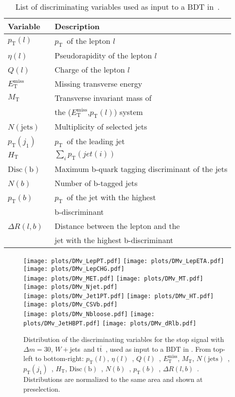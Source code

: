 \documentclass{article}
\newcommand{\pt}{\ensuremath{p_{\mathrm{T}}}~}
\newcommand{\ptl}{\ensuremath{p_{\mathrm{T}}(l)}}
\newcommand{\etl}{\ensuremath{\eta(l)}~}
\newcommand{\chl}{\ensuremath{Q(l)}~}
\newcommand{\met}{\ensuremath{E_\mathrm{T}^\mathrm{miss}}}
\newcommand{\mt}{\ensuremath{M_{\mathrm{T}}}}
\newcommand{\Ht}{\ensuremath{H_{\mathrm{T}}}}
\newcommand{\jeti}[1]{\ensuremath{j_{#1}}}
\newcommand{\ptisr}{\ensuremath{p_{\mathrm{T}}(\jeti{1})}~}
\newcommand{\njet}{\ensuremath{N(\mathrm{jets})}~}
\newcommand{\nbl}{\ensuremath{N(b)}~}
\newcommand{\ptb}{\ensuremath{p_{\mathrm{T}}(b)}~}
\newcommand{\bdisc}{\ensuremath{\mathrm{Disc(b)}}~}
\newcommand{\drLB}{\ensuremath{\Delta R (l, b)}~}
\newcommand{\wjets}{\ensuremath{W+}jets~}
\newcommand{\ttbar}{\ensuremath{\mathrm{t}\bar{\mathrm{t}}}~}
\begin{document}
\begin{table}[!htbp]
\begin{center}  
\begin{tabular}{|l|l|}
\hline
\hline
Variable & Description \\
\hline
 \ptl & \pt of the lepton $l$ \\
 \etl & Pseudorapidity of the lepton $l$ \\
 \chl & Charge of the lepton $l$ \\
 \met & Missing transverse energy \\
 \mt  & Transverse invariant mass of \\
      & the (\met,\ptl) system \\
 \njet & Multiplicity of selected jets \\
 \ptisr & \pt of the leading jet \\
 \Ht & $\sum_i p_\mathrm{T}(jet(i))$ \\
 \bdisc & Maximum b-quark tagging discriminant of the jets \\
 \nbl & Number of b-tagged jets \\
 \ptb & \pt of the jet with the highest \\
      & b-discriminant \\
 \drLB & Distance between the lepton and the \\
       & jet with the highest b-discriminant \\
\hline
\hline
\end{tabular}
\caption{List of discriminating variables used as input to a BDT in~\cite{st4bd}.}
\label{tab:vars}
\end{center}
\end{table}

\begin{figure}[!htbp]
\begin{center}
\texttt{[image: plots/DMv\_LepPT.pdf]}
\texttt{[image: plots/DMv\_LepETA.pdf]}
\texttt{[image: plots/DMv\_LepCHG.pdf]} \\
\texttt{[image: plots/DMv\_MET.pdf]}
\texttt{[image: plots/DMv\_MT.pdf]}
\texttt{[image: plots/DMv\_Njet.pdf]} \\
\texttt{[image: plots/DMv\_Jet1PT.pdf]}
\texttt{[image: plots/DMv\_HT.pdf]}
\texttt{[image: plots/DMv\_CSVb.pdf]} \\
\texttt{[image: plots/DMv\_Nbloose.pdf]}
\texttt{[image: plots/DMv\_JetHBPT.pdf]}
\texttt{[image: plots/DMv\_dRlb.pdf]}
\end{center}
\caption{Distribution of the discriminating variables for the stop
  signal with $\Delta m = 30$, \wjets and \ttbar, used as input to a BDT in 
  \cite{st4bd}. From top-left to bottom-right: \ptl, \etl, \chl, \met, \mt,
  \njet, \ptisr, \Ht, \bdisc, \nbl, \ptb, \drLB. Distributions are normalized
  to the same area and shown at preselection.}
\label{fig:vardm}
\end{figure}
\end{document}
